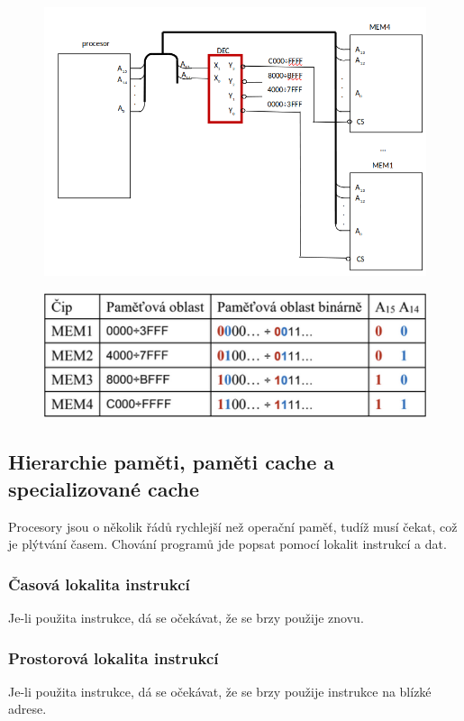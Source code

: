\begin{figure}[h!]
    \centering
    \includegraphics[scale = 0.35]{img/AdrDekoder.png}
\end{figure}
\newpage
\begin{figure}
    \centering
    \includegraphics*[width = \textwidth]{img/AdrDekTab.png}
\end{figure}

\subsection{Hierarchie paměti, paměti cache a specializované cache}
Procesory jsou o několik řádů rychlejší než operační paměť, tudíž musí čekat, což je plýtvání časem.
Chování programů jde popsat pomocí lokalit instrukcí a dat.
\subsubsection*{Časová lokalita instrukcí}
Je-li použita instrukce, dá se očekávat, že se brzy použije znovu.
\subsubsection*{Prostorová lokalita instrukcí}
Je-li použita instrukce, dá se očekávat, že se brzy použije instrukce na blízké adrese.

